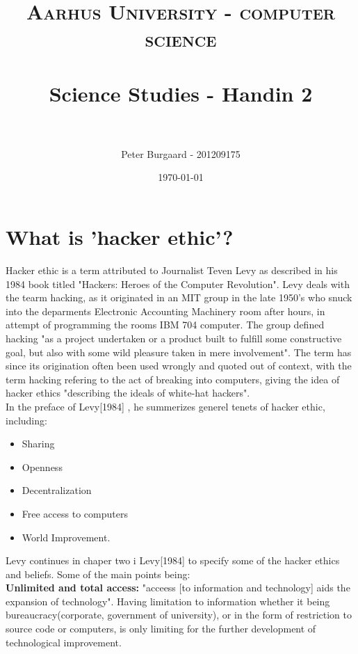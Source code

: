 \documentclass[paper=a4, fontsize=11pt]{scrartcl} %
\title{	
	\normalfont \normalsize 
	\textsc{Aarhus University - computer science} \\ [25pt] %
	\horrule{0.5pt} \\[0.4cm] %
	\huge Science Studies - Handin 2 \\ %
	\horrule{2pt} \\[0.5cm] %
}
\author{Peter Burgaard - 201209175} %
\date{\normalsize\today} %
\numberwithin{equation}{section} %
\numberwithin{figure}{section} %
\numberwithin{table}{section} %
\begin{document}
	
	\maketitle %
	
	\section{What is 'hacker ethic'?}
	
	Hacker ethic is a term attributed to Journalist Teven Levy as described in his 1984 book titled "Hackers: Heroes of the Computer Revolution"\cite{HEM}. Levy deals with the tearm hacking, as it originated in an MIT group in the late 1950's who snuck into the deparments Electronic Accounting Machinery room after hours, in attempt of programming the rooms IBM 704 computer. The group defined hacking "as a project undertaken or a product built to fulfill some constructive goal, but also with some wild pleasure taken in mere involvement"\cite{HEM}. The term has since its origination often been used wrongly and quoted out of context, with the term hacking refering to the act of breaking into computers, giving the idea of hacker ethics "describing the ideals of white-hat hackers"\cite{HEM}.  \\ 
	
	In the preface of Levy[1984] , he summerizes generel tenets of hacker ethic, including\cite{HE1}: 
	\begin{itemize}
		\setlength\itemsep{-0.6em}
		\item Sharing
		\item Openness
		\item Decentralization
		\item Free access to computers
		\item World Improvement.
	\end{itemize}
	
	Levy continues in chaper two i Levy[1984] to specify some of the hacker ethics and beliefs\cite{HE1}. Some of the main points being: \\ 
	
	\textbf{Unlimited and total access:} "acceess [to information and technology] aids the expansion of technology"\cite{HE1}. Having limitation to information whether it being bureaucracy(corporate, government of university), or in the form of restriction to source code or computers, is only limiting for the further development of technological improvement\cite{HE1}. \\ 
	
\end{document}
